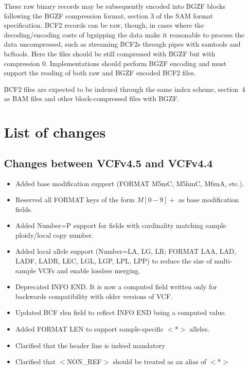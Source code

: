 \documentclass[8pt]{article}
\begin{document}
These raw binary records may be subsequently encoded into BGZF blocks following the BGZF compression format, section 3 of the SAM format specification.
BCF2 records can be raw, though, in cases where the decoding/encoding costs of bgzipping the data make it reasonable to process the data uncompressed, such as streaming BCF2s through pipes with samtools and bcftools.
Here the files should be still compressed with BGZF but with compression 0.
Implementations should perform BGZF encoding and must support the reading of both raw and BGZF encoded BCF2 files.

BCF2 files are expected to be indexed through the same index scheme, section~4 as BAM files and other block-compressed files with BGZF.

\section{List of changes}

\subsection{Changes between VCFv4.5 and VCFv4.4}

\begin{itemize}
	\item Added base modification support (FORMAT M5mC, M5hmC, M6mA, etc.).
	\item Reserved all FORMAT keys of the form $M[0-9]+$ as base modification fields.
	\item Added Number=P support for fields with cardinality matching sample ploidy/local copy number.
	\item Added local allele support (Number=LA, LG, LR; FORMAT LAA, LAD, LADF, LADR, LEC, LGL, LGP, LPL, LPP) to reduce the size of multi-sample VCFs and enable lossless merging.
	\item Deprecated INFO END. It is now a computed field written only for backwards compatibility with older versions of VCF.
	\item Updated BCF rlen field to reflect INFO END being a computed value.
	\item Added FORMAT LEN to support sample-specific $<$*$>$ alleles.
	\item Clarified that the header line is indeed mandatory
	\item Clarified that $<$NON\_REF$>$ should be treated as an alias of $<$*$>$
\end{itemize}
\end{document}
